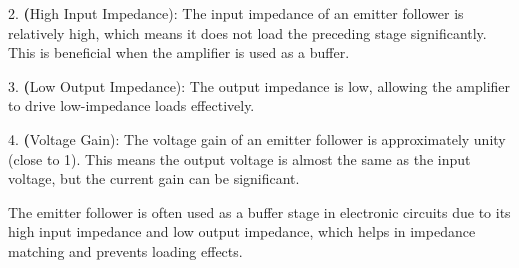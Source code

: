 2. \textbf(High Input Impedance): The input impedance of an emitter follower is relatively high, which means it does not load the preceding stage significantly. This is beneficial when the amplifier is used as a buffer.

3. \textbf(Low Output Impedance): The output impedance is low, allowing the amplifier to drive low-impedance loads effectively.

4. \textbf(Voltage Gain): The voltage gain of an emitter follower is approximately unity (close to 1). This means the output voltage is almost the same as the input voltage, but the current gain can be significant.

The emitter follower is often used as a buffer stage in electronic circuits due to its high input impedance and low output impedance, which helps in impedance matching and prevents loading effects.


